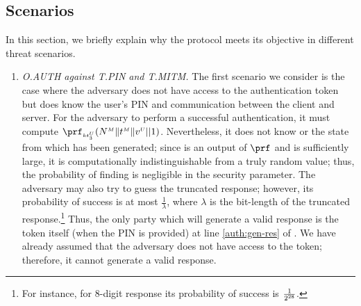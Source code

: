 \vspace{-3mm}
\subsection{Scenarios}
In this section, we briefly explain why the protocol meets its objective in different threat scenarios. 

\begin{enumerate}[leftmargin=5mm]

\item\textit{O.AUTH against 
T.PIN and T.MITM.}  The first scenario we consider is the case where the adversary does not have
access to the authentication token but does know the user's PIN and communication between the client and server.  For the adversary to perform a successful authentication, it must compute $\prf_{\sss\VC{\keyt_{\sss 3}}}(\VM{\nonce} \|  \VM{\trans} \| \VC{\verifier}|| 1)$. Nevertheless, it does not know  or the state from which  has been generated; since   is an output of $\prf$ and is sufficiently large, it is computationally indistinguishable from a truly random value; thus,  the probability of finding  is negligible in the security parameter.  The adversary may also try to guess the truncated response; however, its probability of success is at most $\frac{1}{\lambda}$, where $\lambda$ is the bit-length of the truncated response.\footnote{For instance, for $8$-digit response its probability of success is $\frac{1}{2^{\scriptscriptstyle 28}}$.}  
%
Thus, the only party which will generate a valid response is the token itself (when the PIN is provided) at line \ref{auth:gen-res} of .  We have already assumed that the adversary does not have access to the token; therefore, it cannot generate a valid response.%


\end{enumerate}
